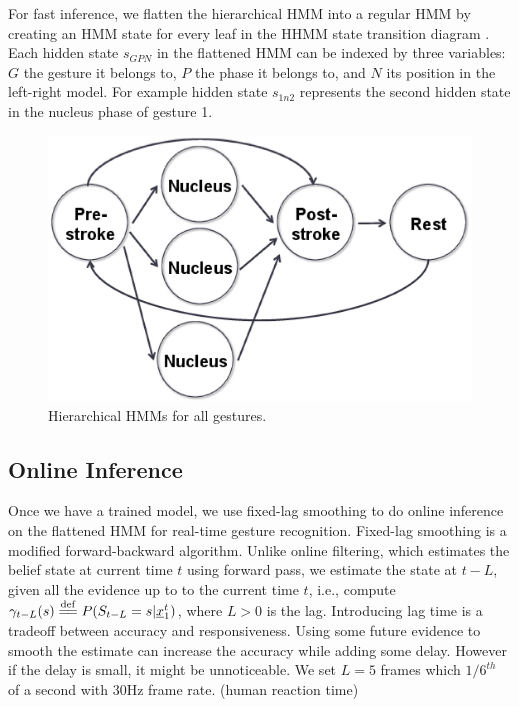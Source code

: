 \documentclass[conference]{IEEEtran}
\newcommand{\eqdef}{\overset{\mathrm{def}}{=\joinrel=}}
\begin{document}
For fast inference, we
flatten the hierarchical HMM into a regular HMM by creating an HMM state for
every leaf in the HHMM state transition diagram \cite{murphy02}. Each
hidden state $s_{GPN}$ in the flattened HMM can be indexed by three variables:
$G$ the gesture it belongs to, $P$ the phase it belongs to, and $N$ its position
in the left-right model. For example hidden state $s_{1n2}$ represents the
second hidden state in the nucleus phase of gesture 1.

\begin{figure}[t]
\centering
\includegraphics[width=\columnwidth]{fig/combined.ps}
\caption{Hierarchical HMMs for all gestures.}
\label{fig:combined}
\end{figure}

\subsection{Online Inference}
Once we have a trained model, we use fixed-lag smoothing \cite{murphy02} to do
online inference on the flattened HMM for real-time gesture recognition.
Fixed-lag smoothing is a modified forward-backward algorithm. Unlike online
filtering, which estimates the belief state at current time $t$ using forward
pass, we estimate the state at $t - L$, given all the evidence up to to the
current time $t$, i.e., compute $\gamma_{t - L}(s) \eqdef P(S_{t -
L} = s|\underline{x}_1^t)$, where $L>0$ is the lag. Introducing lag time is a
tradeoff between accuracy and responsiveness. Using some future evidence to
smooth the estimate can increase the accuracy while adding some delay. However
if the delay is small, it might be unnoticeable. We set $L=5$ frames which
$1/6^{th}$ of a second with 30Hz frame rate. (human reaction time)
\end{document}
